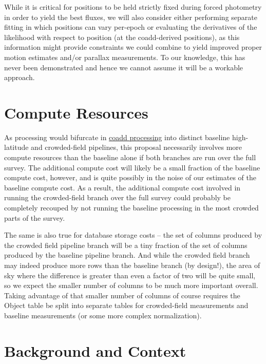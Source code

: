 \documentclass[DM,authoryear,toc]{lsstdoc}
\begin{document}
While it is critical for positions to be held strictly fixed during forced photometry in order to yield the best fluxes, we will also consider either performing separate fitting in which positions can vary per-epoch or evaluating the derivatives of the likelihood with respect to position (at the coadd-derived positions), as this information might provide constraints we could combine to yield improved proper motion estimates and/or parallax measurements.
To our knowledge, this has never been demonstrated and hence we cannot assume it will be a workable approach.

\section{Compute Resources}

As processing would bifurcate in \hyperref[sec:coadd-processing]{coadd processing} into distinct baseline high-latitude and crowded-field pipelines, this proposal necessarily involves more compute resources than the baseline alone if both branches are run over the full survey.
The additional compute cost will likely be a small fraction of the baseline compute cost, however, and is quite possibly in the noise of our estimates of the baseline compute cost.
As a result, the additional compute cost involved in running the crowded-field branch over the full survey could probably be completely recouped by not running the baseline processing in the most crowded parts of the survey.

The same is also true for database storage costs -- the set of columns produced by the crowded field pipeline branch will be a tiny fraction of the set of columns produced by the baseline pipeline branch.
And while the crowded field branch may indeed produce more rows than the baseline branch (by design!), the area of sky where the difference is greater than even a factor of two will be quite small, so we expect the smaller number of columns to be much more important overall.
Taking advantage of that smaller number of columns of course requires the Object table be split into separate tables for crowded-field measurements and baseline measurements (or some more complex normalization).

\appendix

\section{Background and Context}
\label{sec:background}
\end{document}
